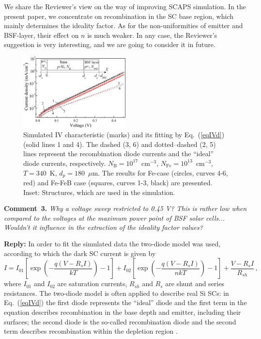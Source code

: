 \documentclass[num-refs]{wiley-article} %
\begin{document}
We share the Reviewer’s view on the way of improving SCAPS simulation. 
In the present paper, we concentrate on recombination in the SC base region, 
which mainly determines the ideality factor. 
As for the non-uniformities of emitter and  BSF-layer, their effect on $n$ is much weaker. 
In any case, the Reviewer’s suggestion is very interesting, and we are going to consider it in future.


\begin{figure}[t]
\centering
\includegraphics[width=0.5\textwidth]{FigIV}
\caption{Simulated IV characteristic (marks)
and its fitting by Eq.~(\ref{eqIVd}) (solid lines 1 and 4).
The dashed (3, 6) and dotted--dashed (2, 5)
lines represent the recombination diode currents and the ``ideal'' diode currents, respectively.
$N_\mathrm{B} = 10^{17}$~cm$^{-3}$, $N_\mathrm{Fe} = 10^{13}$~cm$^{-3}$,
$T = 340$~K, $d_p = 180$~$\mu$m.
The results for Fe-case (circles, curves 4-6, red)
and Fe-FeB case (squares, curves 1-3, black) are presented.
Inset: Structures, which are used in the simulation.
}
\label{fig_IV}
\end{figure}


\vspace{1cm}
\noindent
\textcolor[rgb]{0.00,0.50,1.00}{\textbf{Comment~3.}}
\emph{Why a voltage sweep restricted to 0.45 V?
This is rather low when compared to the voltages at the maximum power point of BSF solar cells...
Wouldn't it influence in the extraction of the ideality factor values?}

\vspace{0.5cm}
\noindent
\textcolor[rgb]{0.51,0.00,0.00}{\textbf{Reply:}}
In order to fit the simulated data the two-diode model was used, 
according to which the dark SC current is given by
\begin{equation}
\label{eqIVd}
    I=I_{01}\left[\exp\left(-\frac{q(V-R_sI)}{kT}\right)-1\right]
      + I_{02}\left[\exp\left(-\frac{q(V-R_sI)}{nkT}\right)-1\right]
      +\frac{V-R_sI}{R_{sh}}\,,
\end{equation}
where
$I_{01}$ and $I_{02}$ are saturation currents,
$R_{sh}$ and $R_s$ are shunt and series resistances.
The two-diode model is often applied to describe real Si SCs:
in Eq.~(\ref{eqIVd}) the first diode represents the ``ideal'' diode 
and the first term in the equation describes recombination 
in the base depth and emitter, including their surfaces;
the second diode is the so-called recombination diode 
and the second term describes recombination within the depletion region \citep{Breitenstein2013}.
\end{document}
